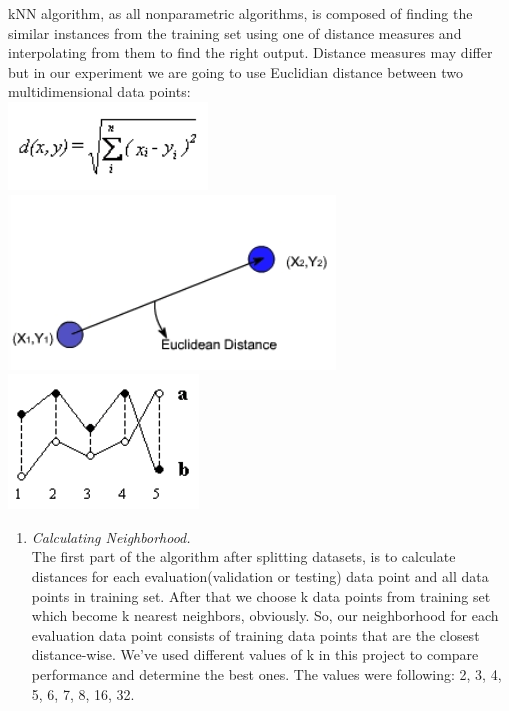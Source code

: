 \documentclass[12pt, letterpaper]{article}
\begin{document}
\begin{enumerate}[label=\Roman*.]
	kNN algorithm, as all nonparametric algorithms, is composed of finding the similar instances from the training set using one of distance measures and interpolating from them to find the right output. Distance measures may differ but in our experiment we are going to use Euclidian distance between two multidimensional data points:\\
	\includegraphics[scale=0.7]{../images/d1.png} 
	\includegraphics[scale=0.5]{../images/d2.png} 
	\includegraphics[scale=0.7]{../images/d3.png} \\
	
	\begin{enumerate}[label=\arabic*.]

	\item {\it Calculating Neighborhood. }\\
	The first part of the algorithm after splitting datasets, is to calculate distances for each evaluation(validation or testing) data point and all data points in training set. After that we choose k data points from training set which become k nearest neighbors, obviously. So, our neighborhood for each evaluation data point consists of training data points that are the closest distance-wise. We've used different values of k in this project to compare performance and determine the best ones. The values were following: 2, 3, 4, 5, 6, 7, 8, 16, 32.\\
	

\end{enumerate}
\end{enumerate}
\end{document}
